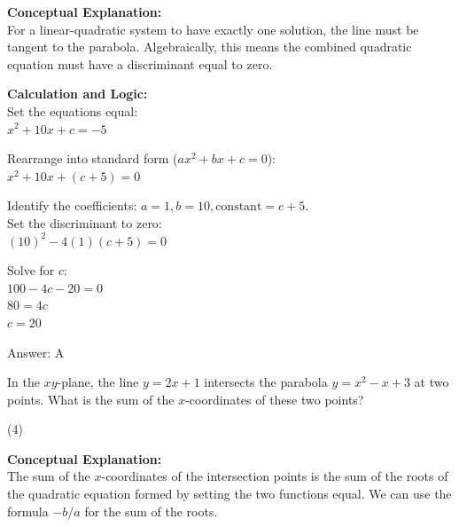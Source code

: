 \documentclass[11pt,paper=a4,answers]{exam}
\begin{document}
\begin{questions}
\begin{solution}
\textbf{Conceptual Explanation:} \\
For a linear-quadratic system to have exactly one solution, the line must be tangent to the parabola. Algebraically, this means the combined quadratic equation must have a discriminant equal to zero.

\vspace{20pt}

\textbf{Calculation and Logic:} \\
Set the equations equal: \\
$x^2 + 10x + c = -5$

\vspace{10pt}

Rearrange into standard form ($ax^2 + bx + c = 0$): \\
$x^2 + 10x + (c + 5) = 0$

\vspace{10pt}

Identify the coefficients: $a = 1, b = 10, \text{constant} = c + 5$. \\
Set the discriminant to zero: \\
$(10)^2 - 4(1)(c + 5) = 0$

\vspace{10pt}

Solve for $c$: \\
$100 - 4c - 20 = 0$ \\
$80 = 4c$ \\
$c = 20$

\vspace{25pt}

Answer: \colorbox{yellow!100}{A}
\end{solution}

\vspace{40pt}

\question
In the $xy$-plane, the line $y = 2x + 1$ intersects the parabola $y = x^2 - x + 3$ at two points. What is the sum of the $x$-coordinates of these two points?
\begin{tasks}(4)
\end{tasks}

\begin{solution}
\textbf{Conceptual Explanation:} \\
The sum of the $x$-coordinates of the intersection points is the sum of the roots of the quadratic equation formed by setting the two functions equal. We can use the formula $-b/a$ for the sum of the roots.


\end{solution}
\end{questions}
\end{document}
